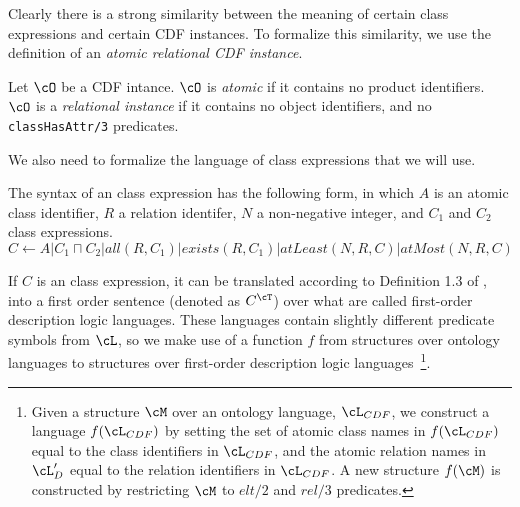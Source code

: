 Clearly there is a strong similarity between the meaning of certain
class expressions and certain CDF instances.  To formalize this
similarity, we use the definition of an {\em atomic relational CDF
instance}.
\begin{definition}
Let $\cO$ be a CDF intance.  $\cO$ is {\em atomic} if it contains no
product identifiers.  $\cO$ is a {\em relational instance} if it
contains no object identifiers, and no {\tt classHasAttr/3}
predicates.
\end{definition}


We also need to formalize the language of class expressions that we
will use.

\begin{definition}
The syntax of an \omsdl{} class expression has the following form, in
which $A$ is an atomic class identifier, $R$ a relation identifer, $N$
a non-negative integer, and $C_1$ and $C_2$ \omsdl{} class expressions.
\[ C \leftarrow A | C_1 \sqcap C_2 | all(R,C_1) | exists(R,C_1) 
	| atLeast(N,R,C) | atMost(N,R,C) \]
\end{definition}

If $C$ is an \omsdl{} class expression, it can be translated according
to Definition 1.3 of \cite{Swif03}, into a first order sentence
(denoted as $C^{\cT}$) over what are called first-order description
logic languages.  These languages contain slightly different predicate
symbols from $\cL$, so we make use of a function $f$ from structures
over ontology languages to structures over first-order description
logic languages~\footnote{Given a structure $\cM$ over an ontology
language, $\cL_{CDF}$, we construct a language $f(\cL_{CDF})$ by
setting the set of atomic class names in $f(\cL_{CDF})$ equal to the
class identifiers in $\cL_{CDF}$, and the atomic relation names in
$\cL'_D$ equal to the relation identifiers in $\cL_{CDF}$.  A new
structure $f(\cM)$ is constructed by restricting $\cM$ to $elt/2$
and $rel/3$ predicates.}.

